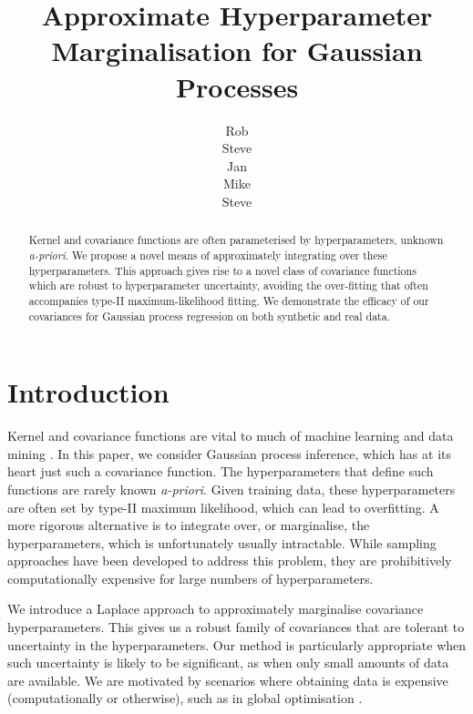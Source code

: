 \documentclass{article}
\title{Approximate Hyperparameter Marginalisation for Gaussian Processes}
\author{
Rob\\
\And
Steve\\
\And
Jan\\
\And
Mike\\
\And
Steve\\}
\begin{document}
\maketitle

\begin{abstract}
Kernel and covariance functions are often parameterised by hyperparameters, unknown {\it a-priori}. We propose a novel means of approximately integrating over these hyperparameters. This approach gives rise to a novel class of covariance functions which are robust to hyperparameter uncertainty, avoiding the over-fitting that often accompanies type-II maximum-likelihood fitting. We demonstrate the efficacy of our covariances for Gaussian process regression on both synthetic and real data.
\end{abstract}


\section{Introduction}

Kernel and covariance functions are vital to much of machine learning and data mining \citep{shawe2004kernel}. In this paper, we consider Gaussian process \citep{rassandwill} inference, which has at its heart just such a covariance function. The hyperparameters that define such functions are rarely known {\it a-priori}. Given training data, these hyperparameters are often set by type-II maximum likelihood, which can lead to overfitting. A more rigorous alternative is to integrate over, or marginalise, the hyperparameters, which is unfortunately usually intractable. While sampling approaches \citep{neal1997monte} have been developed to address this problem, they are prohibitively computationally expensive for large numbers of hyperparameters. 

We introduce a Laplace approach to approximately marginalise covariance hyperparameters. This gives us a robust family of covariances that are tolerant to uncertainty in the hyperparameters. Our method is particularly appropriate when such uncertainty is likely to be significant, as when only small amounts of data are available. We are motivated by scenarios where obtaining data is expensive (computationally or otherwise), such as in global optimisation \citep{osborne2009gaussian}. 
\end{document}
